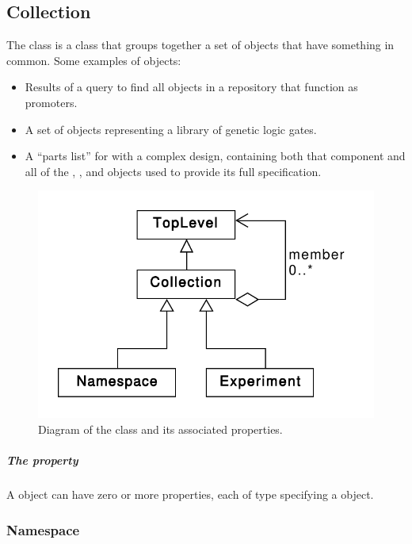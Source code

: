 \subsection {Collection}
\label{sec:Collection}
The  class is a class that groups together a set of  objects that have something in common.
Some examples of  objects:
\begin{itemize}
\item Results of a query to find all  objects in a repository that function as promoters.
\item A set of  objects representing a library of genetic logic gates.
\item A ``parts list'' for  with a complex design, containing both that component and all of the , , and  objects used to provide its full specification.
\end{itemize}

\begin{figure}[ht]
\begin{center}
\includegraphics[scale=0.6]{uml/collection}
\caption[]{Diagram of the  class and its associated properties.}
\label{uml:collection}
\end{center}
\end{figure}

\subparagraph{The  property}\label{sec:member}
A  object can have zero or more  properties, each of type  specifying a  object.

\subsubsection{Namespace}
\label{sec:Namespace}

